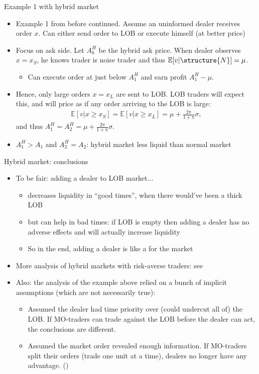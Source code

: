 \documentclass[english,10pt
,aspectratio=169
]{beamer}
\begin{document}
\begin{frame}{Example 1 with hybrid market}
	\begin{itemize}
		\item Example 1 from before continued. Assume an uninformed dealer receives order $x$. Can either send order to LOB or execute himself (at better price) 
		\pause
		\item Focus on ask side. Let $A^H_k$ be the hybrid ask price. When dealer observes $x=x_S$, he knows trader is noise trader and thus $\mathbb{E}[v|\structure{N}]=\mu$. 
		\begin{itemize}
			\item Can execute order at just below $A^H_1$ and earn profit $A^H_1-\mu$.
		\end{itemize}
		\pause
		\item Hence, only large orders $x=x_L$ are sent to LOB. LOB traders will expect this, and will price as if any order arriving to the LOB is large:
		\begin{align*}
			\mathbb{E}[v|x \ge x_S]=\mathbb{E}[v|x \ge x_L]=\mu+\frac{2\pi}{1+\pi} \sigma,
		\end{align*}
		and thus $A^H_1=A^H_2=\mu+\frac{2\pi}{1+\pi} \sigma$.
		\item $A^H_1>A_1$ and $A^H_2=A_2$: hybrid market less liquid than normal market
	\end{itemize}
\end{frame}


\begin{frame}{Hybrid market: conclusions}
	\begin{itemize}
		\item To be fair: adding a dealer to LOB market... 
		\begin{itemize}
			\item decreases liquidity in ``good times'', when there would've been a thick LOB
			\item but can help in bad times: if LOB is empty then adding a dealer has no adverse effects and will actually increase liquidity
			\item So in the end, adding a dealer is like a  for the market
		\end{itemize}
		\item More analysis of hybrid markets with risk-averse traders: see \cite{viswanathan_market_2002}
		\item Also: the analysis of the example above relied on a bunch of implicit assumptions (which are not necessarily true):
		\begin{itemize}
			\item Assumed the dealer had time priority over (could undercut all of) the LOB. If MO-traders can trade against the LOB before the dealer can act, the conclusions are different.
			\item Assumed the market order revealed enough information. If MO-traders split their orders (trade one unit at a time), dealers no longer have any advantage. (\cite{back_working_2007})
		\end{itemize}
	\end{itemize}
\end{frame}
\end{document}
